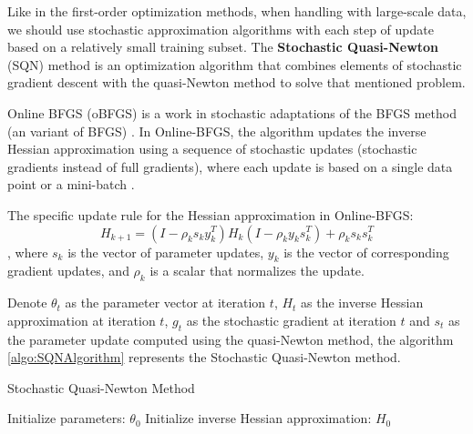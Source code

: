 \documentclass[12pt,a4paper]{article}
\begin{document}
Like in the first-order optimization methods, when handling with large-scale data, we should use stochastic approximation algorithms with each step of update based on a relatively small training subset. The \textbf{Stochastic Quasi-Newton} (SQN) method is an optimization algorithm that combines elements of stochastic gradient descent with the quasi-Newton method to solve that mentioned problem.

Online BFGS (oBFGS) is a work in stochastic adaptations of the BFGS method (an variant of BFGS) \cite{oBFGS} \cite{SQNM}. In Online-BFGS, the algorithm updates the inverse Hessian approximation using a sequence of stochastic updates (stochastic gradients instead of full gradients), where each update is based on a single data point or a mini-batch \cite{SQNM}.

The specific update rule for the Hessian approximation in Online-BFGS:
\begin{equation}
	H_{k+1} = (I - \rho_k s_k y_k^T) H_k (I - \rho_k y_k s_k^T) + \rho_k s_k s_k^T
\end{equation}
, where $s_k$ is the vector of parameter updates, $y_k$ is the vector of corresponding gradient updates, and $\rho_k$ is a scalar that normalizes the update.

Denote \(\theta_t\) as the parameter vector at iteration \(t\), \(H_t\) as the inverse Hessian approximation at iteration \(t\), \(g_t\) as the stochastic gradient at iteration \(t\) and \(s_t\) as the parameter update computed using the quasi-Newton method, the algorithm \ref{algo:SQNAlgorithm} represents the Stochastic Quasi-Newton method.


\begin{algorithm}
	\caption{Stochastic Quasi-Newton Method \cite{SQNAlgo}}
	\label{algo:SQNAlgorithm}
	
	
	Initialize parameters: $\theta_0$\;
	Initialize inverse Hessian approximation: $H_0$\;
	
	
	\Return{$\theta$}
\end{algorithm}
\end{document}
